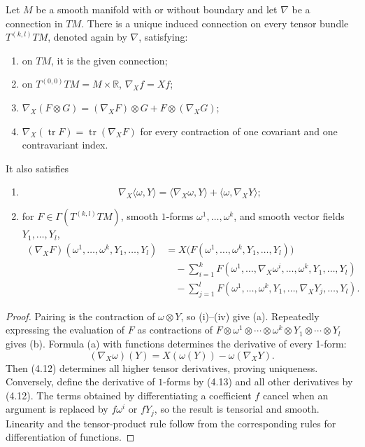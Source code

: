 \begin{proposition}
\label{prop:connection-on-tensor-bundles}
Let $M$ be a smooth manifold with or without boundary and let $\nabla$ be a
connection in $TM$. There is a unique induced connection on every tensor
bundle $T^{(k,l)}TM$, denoted again by $\nabla$, satisfying:
\begin{enumerate}
\item[(i)] on $TM$, it is the given connection;
\item[(ii)] on $T^{(0,0)}TM=M\times\mathbb R$, $\nabla_Xf=Xf$;
\item[(iii)] $\nabla_X(F\otimes G)=(\nabla_XF)\otimes G+F\otimes(\nabla_XG)$;
\item[(iv)] $\nabla_X(\operatorname{tr}F)=\operatorname{tr}(\nabla_XF)$ for every
contraction of one covariant and one contravariant index.
\end{enumerate}
It also satisfies
\begin{enumerate}
\item[(a)]
\[
\nabla_X\langle\omega,Y\rangle
=\langle\nabla_X\omega,Y\rangle+\langle\omega,\nabla_XY\rangle;
\]
\item[(b)] for $F\in\Gamma(T^{(k,l)}TM)$, smooth $1$-forms
$\omega^1,\ldots,\omega^k$, and smooth vector fields $Y_1,\ldots,Y_l$,
\begin{align}
(\nabla_XF)(\omega^1,\ldots,\omega^k,Y_1,\ldots,Y_l)
&=X\big(F(\omega^1,\ldots,\omega^k,Y_1,\ldots,Y_l)\big)\nonumber\\
&\quad-\sum_{i=1}^kF(\omega^1,\ldots,\nabla_X\omega^i,\ldots,\omega^k,Y_1,\ldots,Y_l)\nonumber\\
&\quad-\sum_{j=1}^lF(\omega^1,\ldots,\omega^k,Y_1,\ldots,\nabla_XY_j,\ldots,Y_l).
\label{eq:4.12}\tag{4.12}
\end{align}
\end{enumerate}
\end{proposition}
\begin{proof}
\sketch Pairing is the contraction of $\omega\otimes Y$, so (i)--(iv) give
(a). Repeatedly expressing the evaluation of $F$ as contractions of
$F\otimes\omega^1\otimes\cdots\otimes\omega^k\otimes Y_1\otimes\cdots\otimes
Y_l$ gives (b). Formula (a) with functions determines the derivative of every
1-form:
\begin{equation}
(\nabla_X\omega)(Y)=X(\omega(Y))-\omega(\nabla_XY).
\label{eq:4.13}\tag{4.13}
\end{equation}
Then (4.12) determines all higher tensor derivatives, proving uniqueness.
Conversely, define the derivative of $1$-forms by (4.13) and all other
derivatives by (4.12). The terms obtained by differentiating a coefficient
$f$ cancel when an argument is replaced by $f\omega^i$ or $fY_j$, so the
result is tensorial and smooth. Linearity and the tensor-product rule follow
from the corresponding rules for differentiation of functions.
\end{proof}


